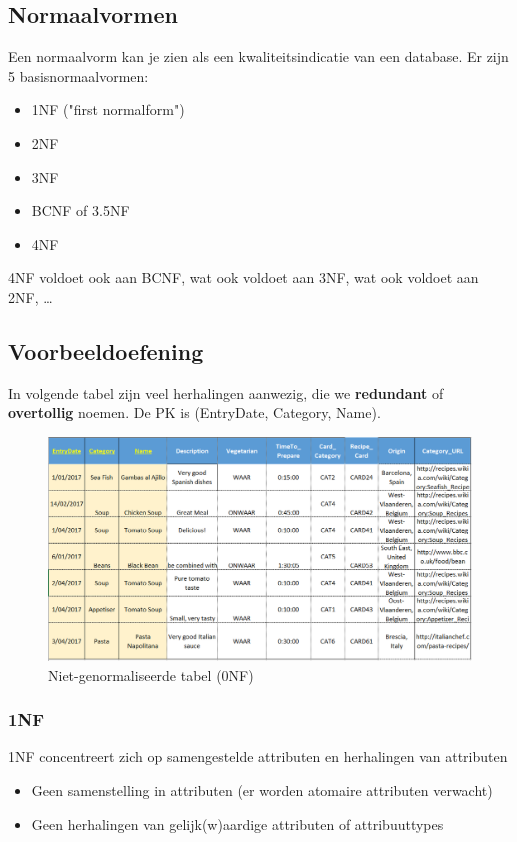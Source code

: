 \documentclass{article}
\newcommand{\bold}[1]{\textbf{#1}}
\begin{document}
\subsection{Normaalvormen}
Een normaalvorm kan je zien als een kwaliteitsindicatie van een database. Er zijn 5 basisnormaalvormen:

\begin{itemize}
    \item 1NF ("first normalform")
    \item 2NF
    \item 3NF
    \item BCNF of 3.5NF
    \item 4NF
\end{itemize}

4NF voldoet ook aan BCNF, wat ook voldoet aan 3NF, wat ook voldoet aan 2NF, \dots

\subsection{Voorbeeldoefening}

In volgende tabel zijn veel herhalingen aanwezig, die we \bold{redundant} of \bold{overtollig} noemen.
De PK is (EntryDate, Category, Name). 

\begin{figure}[H]
    \centering
    \includegraphics[width=\textwidth]{0NF.png}
    \caption{Niet-genormaliseerde tabel (0NF)}
\end{figure}


\subsubsection{1NF}
1NF concentreert zich op samengestelde attributen en herhalingen van attributen
\begin{itemize}
    \item Geen samenstelling in attributen (er worden atomaire attributen verwacht)
    \item Geen herhalingen van gelijk(w)aardige attributen of attribuuttypes
\end{itemize}
\end{document}
